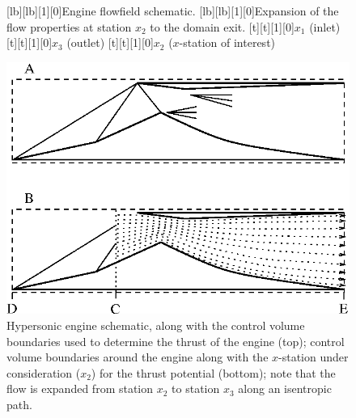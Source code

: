 \documentclass{warpdoc}
\numberwithin{equation}{section}
\newcommand{\fontxfig}{\footnotesize\scalefont{0.918}}
\begin{document}
\begin{figure}[t]
   \fontxfig
   [lb][lb][1][0]{Engine flowfield schematic.}
   [lb][lb][1][0]{Expansion of the flow properties at station $x_2$ 
                            to the domain exit.}
   [t][t][1][0]{$x_1$ (inlet)}
   [t][t][1][0]{$x_3$ (outlet)}
   [t][t][1][0]{$x_2$ ($x$-station of interest)}
   \begin{center}
   \includegraphics[width=5.0in]{engine.eps}
   \end{center}
\caption{Hypersonic engine schematic, along with the control volume 
         boundaries used to determine the thrust of the engine (top); 
         control volume boundaries around the engine along with the
         $x$-station under consideration ($x_2$) for the thrust potential (bottom);
         note that the flow is expanded from 
         station $x_2$ to station $x_3$ along an isentropic path.}
\label{fig:engine}
\end{figure}
%
\end{document}
